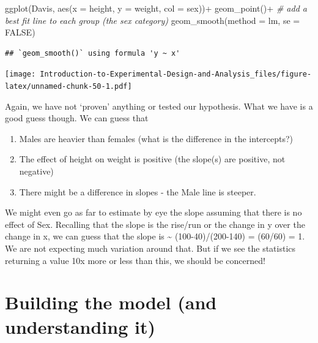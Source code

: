\documentclass[
]{book}
\newenvironment{Shaded}{\begin{snugshade}}{\end{snugshade}}
\newcommand{\AttributeTok}[1]{\textcolor[rgb]{0.77,0.63,0.00}{#1}}
\newcommand{\CommentTok}[1]{\textcolor[rgb]{0.56,0.35,0.01}{\textit{#1}}}
\newcommand{\ConstantTok}[1]{\textcolor[rgb]{0.00,0.00,0.00}{#1}}
\newcommand{\FunctionTok}[1]{\textcolor[rgb]{0.00,0.00,0.00}{#1}}
\newcommand{\NormalTok}[1]{#1}
\newcommand{\SpecialCharTok}[1]{\textcolor[rgb]{0.00,0.00,0.00}{#1}}
\providecommand{\tightlist}{%
  \setlength{\itemsep}{0pt}\setlength{\parskip}{0pt}}
\begin{document}
\begin{Shaded}
\begin{Highlighting}[]
\FunctionTok{ggplot}\NormalTok{(Davis, }\FunctionTok{aes}\NormalTok{(}\AttributeTok{x =}\NormalTok{ height, }\AttributeTok{y =}\NormalTok{ weight, }\AttributeTok{col =}\NormalTok{ sex))}\SpecialCharTok{+}
  \FunctionTok{geom\_point}\NormalTok{()}\SpecialCharTok{+}
  \CommentTok{\# add a best fit line to each group (the sex category)}
  \FunctionTok{geom\_smooth}\NormalTok{(}\AttributeTok{method =}\NormalTok{ lm, }\AttributeTok{se =} \ConstantTok{FALSE}\NormalTok{)}
\end{Highlighting}
\end{Shaded}

\begin{verbatim}
## `geom_smooth()` using formula 'y ~ x'
\end{verbatim}

\texttt{[image: Introduction-to-Experimental-Design-and-Analysis\_files/figure-latex/unnamed-chunk-50-1.pdf]}

Again, we have not `proven' anything or tested our hypothesis. What we have is a good guess though. We can guess that

\begin{enumerate}
\def\labelenumi{\arabic{enumi}.}
\tightlist
\item
  Males are heavier than females (what is the difference in the intercepts?)
\item
  The effect of height on weight is positive (the slope(s) are positive, not negative)
\item
  There might be a difference in slopes - the Male line is steeper.
\end{enumerate}

We might even go as far to estimate by eye the slope assuming that there is no effect of Sex. Recalling that the slope is the rise/run or the change in y over the change in x, we can guess that the slope is \textasciitilde{} (100-40)/(200-140) = (60/60) = 1. We are not expecting much variation around that. But if we see the statistics returning a value 10x more or less than this, we should be concerned!

\hypertarget{building-the-model-and-understanding-it}{%
\section{Building the model (and understanding it)}\label{building-the-model-and-understanding-it}}
\end{document}
